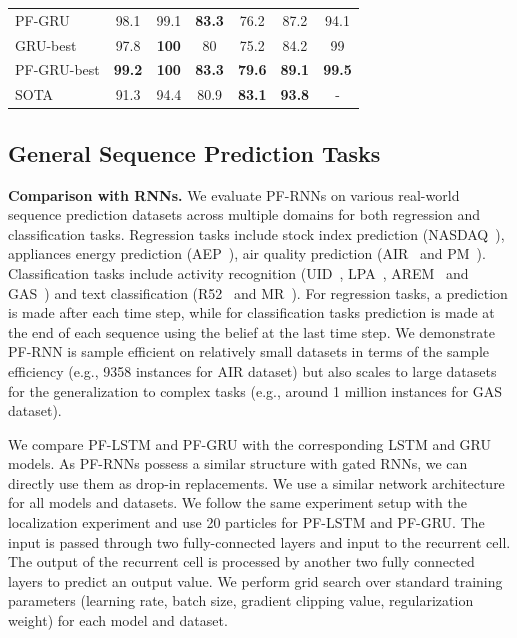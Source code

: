 \documentclass[letterpaper]{article} %
\begin{document}
\begin{table}[!htb]
{\begin{tabular}{lcccccc}
PF-GRU       & 98.1          & 99.1         & \textbf{83.3} & 76.2          & 87.2          & 94.1          \\
GRU-best     & 97.8          & \textbf{100} & 80            & 75.2          & 84.2          & 99            \\
PF-GRU-best  & \textbf{99.2} & \textbf{100} & \textbf{83.3} & \textbf{79.6} & \textbf{89.1} & \textbf{99.5} \\
SOTA         & 91.3          & 94.4         & 80.9          & \textbf{83.1} & \textbf{93.8} & -         \\
\bottomrule
\end{tabular}
    }
\end{table}
		
		
		
		
		
		
		
		
		
		
\subsection{General Sequence Prediction Tasks}

\textbf{Comparison with RNNs.} We evaluate PF-RNNs on various real-world sequence prediction datasets across multiple domains for both regression and classification tasks. Regression tasks include stock index prediction (NASDAQ~\cite{qin2017dual}), appliances energy prediction (AEP~\cite{candanedo2017data}), air quality prediction (AIR~\cite{de2008field} and PM~\cite{liang2015assessing}). Classification tasks include activity recognition (UID~\cite{casale2012personalization}, LPA~\cite{kaluvza2010agent}, AREM~\cite{palumbo2016human} and GAS~\cite{huerta2016online}) and text classification (R52~\cite{2007:phd-Ana-Cardoso-Cachopo} and MR~\cite{maas-EtAl:2011:ACL-HLT2011}). For regression tasks, a prediction is made after each time step, while for classification tasks prediction is made at the end of each sequence using the belief at the last time step. We demonstrate PF-RNN is sample efficient on relatively small datasets in terms of the sample efficiency (e.g., 9358 instances for AIR dataset) but also scales to large datasets for the generalization to complex tasks (e.g., around 1 million instances for GAS dataset).

We compare PF-LSTM and PF-GRU with the corresponding LSTM and GRU models. As PF-RNNs possess a similar structure with gated RNNs, we can directly use them as drop-in replacements.
We use a similar network architecture for all models and datasets. We follow the same experiment setup with the localization experiment and use 20 particles for PF-LSTM and PF-GRU. The input is passed through two fully-connected layers and input to the recurrent cell. The output of the recurrent cell is processed by another two fully connected layers to predict an output value. 
We perform grid search over standard training parameters (learning rate, batch size, gradient clipping value, regularization weight) for each model and dataset.
\end{document}
